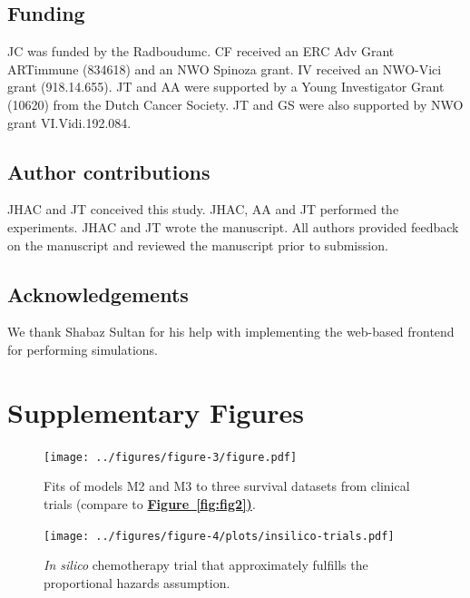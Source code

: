 \documentclass[a4paper,10pt]{article}
\newcommand{\myref}[2]{\hyperref[#1]{\bfseries Figure~\ref*{#1}#2}}
\begin{document}
\subsection*{Funding}
JC was funded by the Radboudumc. CF received an ERC Adv Grant ARTimmune (834618) and an NWO
Spinoza grant. IV received an NWO-Vici grant (918.14.655). JT and AA were supported by a Young Investigator
Grant (10620) from the Dutch Cancer Society. JT and GS were also supported by NWO grant VI.Vidi.192.084.

\subsection*{Author contributions}
JHAC and JT conceived this study. JHAC, AA and JT performed the experiments.
JHAC and JT wrote the manuscript. 
All authors provided feedback on the manuscript and reviewed the manuscript
prior to submission.

\subsection*{Acknowledgements}
We thank Shabaz Sultan for his help with implementing the web-based frontend for performing simulations.

\appendix

\clearpage

\section*{Supplementary Figures}



\renewcommand{\thefigure}{S\arabic{sfigure}}
\renewcommand{\thetable}{S\arabic{stable}}
\renewcommand{\figurename}{Supplementary Figure}
\renewcommand{\tablename}{Supplementary Table}


\begin{figure}[h]

\texttt{[image: ../figures/figure-3/figure.pdf]}

\caption{Fits of models M2 and M3 to three survival datasets from clinical trials (compare to \myref{fig:fig2}).}
\label{fig:fits_m2_m3}
\end{figure}



\begin{figure}[h]

\texttt{[image: ../figures/figure-4/plots/insilico-trials.pdf]}

\caption{\emph{In silico} chemotherapy trial that approximately fulfills the proportional hazards assumption.}
\label{fig:chemotherapy_prophaz}
\end{figure}
\end{document}
